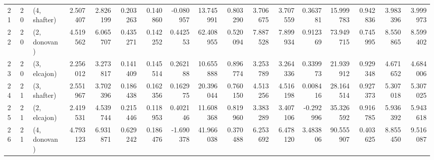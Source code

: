 \begin{tabular}{lllrrrrrrrrrrrrrr}
21 &    20 &  (4, shafter) &  2.507407 &  2.826199 &   0.203263 &  0.140860 & -0.080957 &  13.745991 &  0.803290 &   3.706675 &  3.707559 &  0.363781 &   15.999783 &  0.942836 &  3.983396 &   3.999973 \\
22 &    20 &  (2, donovan) &  4.519562 &  6.065707 &   0.435271 &  0.142252 &  0.442553 &  62.408955 &  0.520094 &   7.887528 &  7.899934 &  0.912369 &   73.949715 &  0.745995 &  8.550865 &   8.599402 \\
23 &    20 &  (3, elcajon) &  2.256012 &  3.273817 &   0.141409 &  0.145514 &  0.262188 &  10.655888 &  0.896774 &   3.253789 &  3.264336 &  0.339973 &   21.939912 &  0.929348 &  4.671652 &   4.684006 \\
24 &    21 &  (3, shafter) &  2.551967 &  3.702396 &   0.186438 &  0.162356 &  0.162975 &  20.396044 &  0.760150 &   4.513256 &  4.516198 &  0.008416 &   28.164514 &  0.927373 &  5.307018 &   5.307025 \\
25 &    21 &  (2, elcajon) &  2.419531 &  4.539744 &   0.215446 &  0.118953 &  0.402146 &  11.608368 &  0.819960 &   3.383289 &  3.407106 & -0.292996 &   35.326592 &  0.916785 &  5.936392 &   5.943618 \\
26 &    21 &  (4, donovan) &  4.793123 &  6.931871 &   0.629242 &  0.186476 & -1.690378 &  41.966038 &  0.370488 &   6.253692 &  6.478120 &  3.483806 &   90.555907 &  0.403625 &  8.855450 &   9.516087 \\
\bottomrule
\end{tabular}

